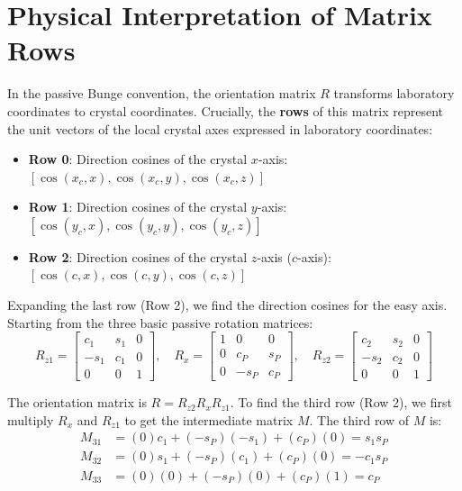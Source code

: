 \documentclass[11pt]{article}
\begin{document}
\section{Physical Interpretation of Matrix Rows}
In the passive Bunge convention, the orientation matrix $R$ transforms laboratory coordinates to crystal coordinates. Crucially, the \textbf{rows} of this matrix represent the unit vectors of the local crystal axes expressed in laboratory coordinates:
\begin{itemize}
    \item \textbf{Row 0}: Direction cosines of the crystal $x$-axis: $[\cos(x_c, x), \cos(x_c, y), \cos(x_c, z)]$
    \item \textbf{Row 1}: Direction cosines of the crystal $y$-axis: $[\cos(y_c, x), \cos(y_c, y), \cos(y_c, z)]$
    \item \textbf{Row 2}: Direction cosines of the crystal $z$-axis ($c$-axis): $[\cos(c, x), \cos(c, y), \cos(c, z)]$
\end{itemize}

Expanding the last row (Row 2), we find the direction cosines for the easy axis. Starting from the three basic passive rotation matrices:
\begin{equation*}
    R_{z1} = \begin{bmatrix} c_1 & s_1 & 0 \\ -s_1 & c_1 & 0 \\ 0 & 0 & 1 \end{bmatrix}, \quad
    R_{x} = \begin{bmatrix} 1 & 0 & 0 \\ 0 & c_P & s_P \\ 0 & -s_P & c_P \end{bmatrix}, \quad
    R_{z2} = \begin{bmatrix} c_2 & s_2 & 0 \\ -s_2 & c_2 & 0 \\ 0 & 0 & 1 \end{bmatrix}
\end{equation*}

The orientation matrix is $R = R_{z2} R_{x} R_{z1}$. To find the third row (Row 2), we first multiply $R_{x}$ and $R_{z1}$ to get the intermediate matrix $M$. The third row of $M$ is:
\begin{align*}
    M_{31} &= (0)c_1 + (-s_P)(-s_1) + (c_P)(0) = s_1 s_P \\
    M_{32} &= (0)s_1 + (-s_P)(c_1) + (c_P)(0) = -c_1 s_P \\
    M_{33} &= (0)(0) + (-s_P)(0) + (c_P)(1) = c_P
\end{align*}
\end{document}
